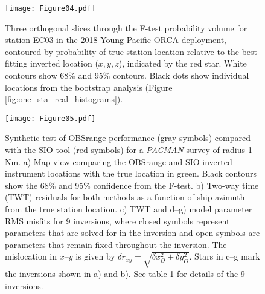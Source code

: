 \begin{figure}[h]
\texttt{[image: Figure04.pdf]}
\caption{ Three orthogonal slices through the F-test probability volume for station EC03 in the 2018 Young Pacific ORCA deployment, contoured by probability of true station location relative to the best fitting inverted location ($\bar{x},\bar{y},\bar{z}$), indicated by the red star. White contours show 68\% and 95\% contours. Black dots show individual locations from the bootstrap analysis (Figure \ref{fig:one_sta_real_histograms}). }
\label{fig:one_sta_real_ftests}
\end{figure}



\begin{figure}[h]
\texttt{[image: Figure05.pdf]}
\caption{ Synthetic test of OBSrange performance (gray symbols) compared with the SIO tool (red symbols) for a \textit{PACMAN} survey of radius 1 Nm. a) Map view comparing the OBSrange and SIO inverted instrument locations with the true location in green. Black contours show the 68\% and 95\% confidence from the F-test. b) Two-way time (TWT) residuals for both methods as a function of ship azimuth from the true station location. c) TWT and d--g) model parameter RMS misfits for 9 inversions, where closed symbols represent parameters that are solved for in the inversion and open symbols are parameters that remain fixed throughout the inversion. The mislocation in $x$--$y$ is given by $\delta r_{xy} = \sqrt{\delta x_{O}^2 + \delta y_{O}^2} $. Stars in c--g mark the inversions shown in a) and b). See table 1 for details of the 9 inversions.}
\label{fig:compare_tool}
\end{figure}


